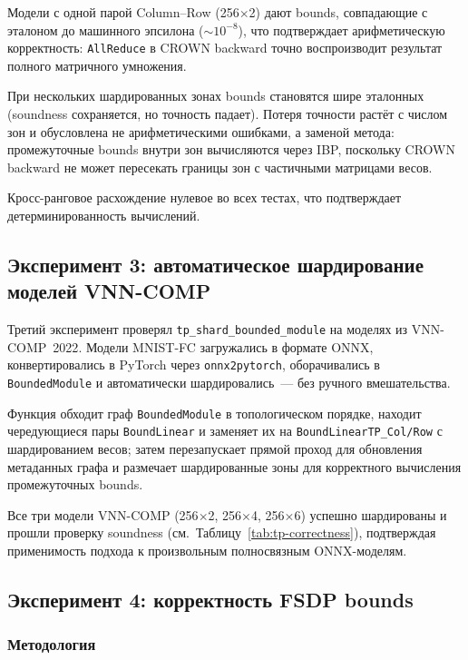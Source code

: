 Модели с одной парой Column--Row (256$\times$2) дают bounds,
совпадающие с эталоном до машинного эпсилона ($\sim 10^{-8}$),
что подтверждает арифметическую корректность: \texttt{AllReduce}
в CROWN backward точно воспроизводит результат полного матричного
умножения.

При нескольких шардированных зонах bounds становятся шире
эталонных (soundness сохраняется, но точность падает).
Потеря точности растёт с числом зон и обусловлена не
арифметическими ошибками, а заменой метода: промежуточные bounds
внутри зон вычисляются через IBP, поскольку CROWN backward не может
пересекать границы зон с частичными матрицами весов.

Кросс-ранговое расхождение нулевое во всех тестах, что
подтверждает детерминированность вычислений.

\subsection{Эксперимент 3: автоматическое шардирование моделей VNN-COMP}

Третий эксперимент проверял \texttt{tp\_shard\_bounded\_module}
на моделях из VNN-COMP~2022\cite{arXiv2212VNNCOMP2022}.
Модели MNIST-FC загружались в формате ONNX, конвертировались
в PyTorch через \texttt{onnx2pytorch}, оборачивались
в \texttt{BoundedModule} и автоматически шардировались~---
без ручного вмешательства.

Функция обходит граф \texttt{BoundedModule} в топологическом порядке,
находит чередующиеся пары \texttt{BoundLinear} и заменяет их на
\texttt{BoundLinearTP\_Col/Row} с шардированием весов;
затем перезапускает прямой проход для обновления метаданных графа
и размечает шардированные зоны для корректного вычисления
промежуточных bounds.

Все три модели VNN-COMP (256$\times$2, 256$\times$4, 256$\times$6)
успешно шардированы и прошли проверку soundness
(см.~Таблицу~\ref{tab:tp-correctness}), подтверждая применимость
подхода к произвольным полносвязным ONNX-моделям.

\subsection{Эксперимент 4: корректность FSDP bounds}

\subsubsection{Методология}

